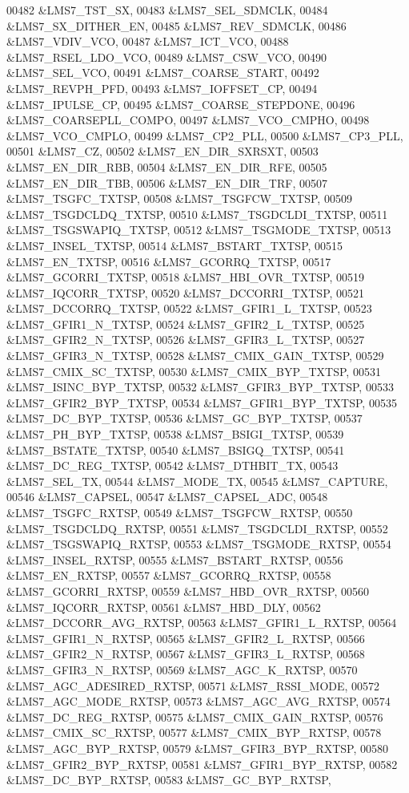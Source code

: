 \begin{DoxyCode}
00482 &LMS7_TST_SX,
00483 &LMS7_SEL_SDMCLK,
00484 &LMS7_SX_DITHER_EN,
00485 &LMS7_REV_SDMCLK,
00486 &LMS7_VDIV_VCO,
00487 &LMS7_ICT_VCO,
00488 &LMS7_RSEL_LDO_VCO,
00489 &LMS7_CSW_VCO,
00490 &LMS7_SEL_VCO,
00491 &LMS7_COARSE_START,
00492 &LMS7_REVPH_PFD,
00493 &LMS7_IOFFSET_CP,
00494 &LMS7_IPULSE_CP,
00495 &LMS7_COARSE_STEPDONE,
00496 &LMS7_COARSEPLL_COMPO,
00497 &LMS7_VCO_CMPHO,
00498 &LMS7_VCO_CMPLO,
00499 &LMS7_CP2_PLL,
00500 &LMS7_CP3_PLL,
00501 &LMS7_CZ,
00502 &LMS7_EN_DIR_SXRSXT,
00503 &LMS7_EN_DIR_RBB,
00504 &LMS7_EN_DIR_RFE,
00505 &LMS7_EN_DIR_TBB,
00506 &LMS7_EN_DIR_TRF,
00507 &LMS7_TSGFC_TXTSP,
00508 &LMS7_TSGFCW_TXTSP,
00509 &LMS7_TSGDCLDQ_TXTSP,
00510 &LMS7_TSGDCLDI_TXTSP,
00511 &LMS7_TSGSWAPIQ_TXTSP,
00512 &LMS7_TSGMODE_TXTSP,
00513 &LMS7_INSEL_TXTSP,
00514 &LMS7_BSTART_TXTSP,
00515 &LMS7_EN_TXTSP,
00516 &LMS7_GCORRQ_TXTSP,
00517 &LMS7_GCORRI_TXTSP,
00518 &LMS7_HBI_OVR_TXTSP,
00519 &LMS7_IQCORR_TXTSP,
00520 &LMS7_DCCORRI_TXTSP,
00521 &LMS7_DCCORRQ_TXTSP,
00522 &LMS7_GFIR1_L_TXTSP,
00523 &LMS7_GFIR1_N_TXTSP,
00524 &LMS7_GFIR2_L_TXTSP,
00525 &LMS7_GFIR2_N_TXTSP,
00526 &LMS7_GFIR3_L_TXTSP,
00527 &LMS7_GFIR3_N_TXTSP,
00528 &LMS7_CMIX_GAIN_TXTSP,
00529 &LMS7_CMIX_SC_TXTSP,
00530 &LMS7_CMIX_BYP_TXTSP,
00531 &LMS7_ISINC_BYP_TXTSP,
00532 &LMS7_GFIR3_BYP_TXTSP,
00533 &LMS7_GFIR2_BYP_TXTSP,
00534 &LMS7_GFIR1_BYP_TXTSP,
00535 &LMS7_DC_BYP_TXTSP,
00536 &LMS7_GC_BYP_TXTSP,
00537 &LMS7_PH_BYP_TXTSP,
00538 &LMS7_BSIGI_TXTSP,
00539 &LMS7_BSTATE_TXTSP,
00540 &LMS7_BSIGQ_TXTSP,
00541 &LMS7_DC_REG_TXTSP,
00542 &LMS7_DTHBIT_TX,
00543 &LMS7_SEL_TX,
00544 &LMS7_MODE_TX,
00545 &LMS7_CAPTURE,
00546 &LMS7_CAPSEL,
00547 &LMS7_CAPSEL_ADC,
00548 &LMS7_TSGFC_RXTSP,
00549 &LMS7_TSGFCW_RXTSP,
00550 &LMS7_TSGDCLDQ_RXTSP,
00551 &LMS7_TSGDCLDI_RXTSP,
00552 &LMS7_TSGSWAPIQ_RXTSP,
00553 &LMS7_TSGMODE_RXTSP,
00554 &LMS7_INSEL_RXTSP,
00555 &LMS7_BSTART_RXTSP,
00556 &LMS7_EN_RXTSP,
00557 &LMS7_GCORRQ_RXTSP,
00558 &LMS7_GCORRI_RXTSP,
00559 &LMS7_HBD_OVR_RXTSP,
00560 &LMS7_IQCORR_RXTSP,
00561 &LMS7_HBD_DLY,
00562 &LMS7_DCCORR_AVG_RXTSP,
00563 &LMS7_GFIR1_L_RXTSP,
00564 &LMS7_GFIR1_N_RXTSP,
00565 &LMS7_GFIR2_L_RXTSP,
00566 &LMS7_GFIR2_N_RXTSP,
00567 &LMS7_GFIR3_L_RXTSP,
00568 &LMS7_GFIR3_N_RXTSP,
00569 &LMS7_AGC_K_RXTSP,
00570 &LMS7_AGC_ADESIRED_RXTSP,
00571 &LMS7_RSSI_MODE,
00572 &LMS7_AGC_MODE_RXTSP,
00573 &LMS7_AGC_AVG_RXTSP,
00574 &LMS7_DC_REG_RXTSP,
00575 &LMS7_CMIX_GAIN_RXTSP,
00576 &LMS7_CMIX_SC_RXTSP,
00577 &LMS7_CMIX_BYP_RXTSP,
00578 &LMS7_AGC_BYP_RXTSP,
00579 &LMS7_GFIR3_BYP_RXTSP,
00580 &LMS7_GFIR2_BYP_RXTSP,
00581 &LMS7_GFIR1_BYP_RXTSP,
00582 &LMS7_DC_BYP_RXTSP,
00583 &LMS7_GC_BYP_RXTSP,

\end{DoxyCode}

